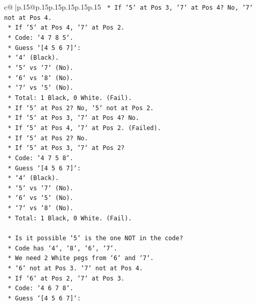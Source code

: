 \documentclass{article}
\begin{document}
{\begin{supertabular}{c@{$\;$}|p{.15\linewidth}@{}p{.15\linewidth}p{.15\linewidth}p{.15\linewidth}p{.15\linewidth}p{.15\linewidth}}
{{{\texttt{        *   If `5` at Pos 3, `7` at Pos 4? No, `7` not at Pos 4.} \\
\texttt{        *   If `5` at Pos 4, `7` at Pos 2.} \\
\texttt{        *   Code: `4 7 8 5`.} \\
\texttt{        *   Guess `{[}4 5 6 7{]}`:} \\
\texttt{            *   `4` (Black).} \\
\texttt{            *   `5` vs `7` (No).} \\
\texttt{            *   `6` vs `8` (No).} \\
\texttt{            *   `7` vs `5` (No).} \\
\texttt{            *   Total: 1 Black, 0 White. (Fail).} \\
\texttt{        *   If `5` at Pos 2? No, `5` not at Pos 2.} \\
\texttt{        *   If `5` at Pos 3, `7` at Pos 4? No.} \\
\texttt{        *   If `5` at Pos 4, `7` at Pos 2. (Failed).} \\
\texttt{        *   If `5` at Pos 2? No.} \\
\texttt{        *   If `5` at Pos 3, `7` at Pos 2?} \\
\texttt{        *   Code: `4 7 5 8`.} \\
\texttt{        *   Guess `{[}4 5 6 7{]}`:} \\
\texttt{            *   `4` (Black).} \\
\texttt{            *   `5` vs `7` (No).} \\
\texttt{            *   `6` vs `5` (No).} \\
\texttt{            *   `7` vs `8` (No).} \\
\texttt{            *   Total: 1 Black, 0 White. (Fail).} \\
\\ 
\texttt{    *   Is it possible `5` is the one NOT in the code?} \\
\texttt{        *   Code has `4`, `8`, `6`, `7`.} \\
\texttt{        *   We need 2 White pegs from `6` and `7`.} \\
\texttt{        *   `6` not at Pos 3. `7` not at Pos 4.} \\
\texttt{        *   If `6` at Pos 2, `7` at Pos 3.} \\
\texttt{        *   Code: `4 6 7 8`.} \\
\texttt{        *   Guess `{[}4 5 6 7{]}`:} \\
}}}
\end{supertabular}}
\end{document}
